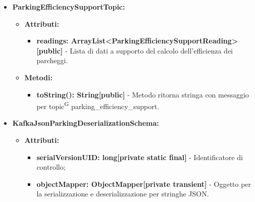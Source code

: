 \documentclass[8pt]{article}
\newcommand{\glossterm}[1]{#1\textsuperscript{G}} %
\begin{document}
\begin{itemize}
\begin{itemize}
\begin{itemize}
        \end{itemize}
    \end{itemize}
    \begin{itemize}
	\setlength\itemsep{0em}
        \item \textbf{Metodi:}
        \begin{itemize}
	\setlength\itemsep{0em}
            \item \textbf{toString(): String[public]} - Metodo ritorna stringa con messaggio per \glossterm{topic} parking\_efficiency.
        \end{itemize}
    \end{itemize}
    \item \textbf{ParkingEfficiencySupportTopic:}
    \begin{itemize}
	\setlength\itemsep{0em}
        \item \textbf{Attributi:}
        \begin{itemize}
	\setlength\itemsep{0em}
            \item \textbf{readings: ArrayList<ParkingEfficiencySupportReading>[public]} - Lista di dati a supporto del calcolo dell'efficienza dei parcheggi.
        \end{itemize}
    \end{itemize}
    \begin{itemize}
	\setlength\itemsep{0em}
        \item \textbf{Metodi:}
        \begin{itemize}
	\setlength\itemsep{0em}
            \item \textbf{toString(): String[public]} - Metodo ritorna stringa con messaggio per \glossterm{topic} parking\_efficiency\_support.
        \end{itemize}
    \end{itemize}
    \item \textbf{KafkaJsonParkingDeserializationSchema:}
    \begin{itemize}
	\setlength\itemsep{0em}
        \item \textbf{Attributi:}
        \begin{itemize}
	\setlength\itemsep{0em}
            \item \textbf{serialVersionUID: long[private static final]} - Identificatore di controllo;
            \item \textbf{objectMapper: ObjectMapper[private transient]} - Oggetto per la serializzazione e deserializzazione per stringhe JSON.
        \end{itemize}

\end{itemize}
\end{itemize}
\end{document}
